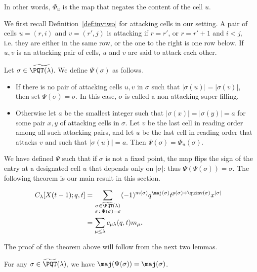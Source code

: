 In other words, $\Phi_u$ is the map that negates the content of the cell $u$. 

We first recall Definition~\ref{def:invtwo} for attacking cells in our setting. A pair of cells $u=(r,i)$ and $v=(r',j)$ is attacking if $r=r'$, or $r=r'+1$ and $i<j$, i.e. they are either in the same row, or the one to the right is one row below. If $u,v$ is an attacking pair of cells, $u$ and $v$ are said to attack each other.

\vspace{0.1in}
\begin{defn}
\label{def:attackpair}
Let $\sigma \in\widetilde{\PQT(\lambda)}$. We define $\Psi(\sigma)$ as follows.
\begin{itemize}[leftmargin=10pt]
\item If there is no pair of attacking cells $u,v$ in $\sigma$ such that $|\sigma(u)|=|\sigma(v)|$, then set $\Psi(\sigma)=\sigma$. In this case, $\sigma$ is called a non-attacking super filling.
\item Otherwise let $a$ be the smallest integer such that $|\sigma(x)|=|\sigma(y)|=a$ for some pair $x,y$ of attacking cells in $\sigma$. Let $v$ be the last cell in reading order among all such attacking pairs, and let $u$ be the last cell in reading order that attacks $v$ and such that $|\sigma(u)|=a$. Then $\Psi(\sigma)=\Phi_u(\sigma)$.
\end{itemize}
\end{defn}

We have defined $\Psi$ such that if $\sigma$ is not a fixed point, the map flips the sign of the entry at a designated cell $u$ that depends only on $|\sigma|$: thus $\Psi(\Psi(\sigma))=\sigma$. The following theorem is our main result in this section.

\begin{theorem}
\label{lem:A1FP}
\begin{align*}
C_{\lambda}[X(t-1);q,t]& = \sum_{\substack{\sigma\in\widetilde{\PQT}(\lambda)\\\sigma\,:\,\Psi(\sigma)=\sigma}} (-1)^{m(\sigma)} q^{\maj(\sigma)}t^{p(\sigma)+\quinv(\sigma)}x^{|\sigma|}\\
&=\sum_{\mu \leq \lambda} c_{\mu\lambda}(q,t)m_{\mu}.
\end{align*}
\end{theorem}

The proof of the theorem above will follow from the next two lemmas.

\begin{lemma}\label{lem:A1maj}
For any $\sigma\in\widetilde{\PQT}(\lambda)$, we have $\maj(\Psi(\sigma))=\maj(\sigma)$.
\end{lemma}

